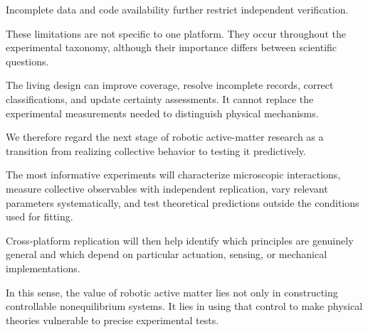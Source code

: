 Incomplete data
and code availability
further restrict
independent verification.

These limitations
are not specific
to one platform.
They occur
throughout the
experimental
taxonomy,
although their
importance differs
between scientific
questions.

The living design
can improve
coverage,
resolve incomplete
records,
correct classifications,
and update
certainty assessments.
It cannot
replace the
experimental
measurements
needed to
distinguish
physical mechanisms.

We therefore
regard the
next stage
of robotic
active-matter
research as
a transition
from realizing
collective
behavior to
testing it
predictively.

The most
informative
experiments
will characterize
microscopic
interactions,
measure collective
observables
with independent
replication,
vary relevant
parameters
systematically,
and test
theoretical
predictions
outside the
conditions used
for fitting.

Cross-platform
replication
will then
help identify
which principles
are genuinely
general and
which depend
on particular
actuation,
sensing,
or mechanical
implementations.

In this
sense,
the value
of robotic
active matter
lies not
only in
constructing
controllable
nonequilibrium
systems.
It lies
in using
that control
to make
physical theories
vulnerable
to precise
experimental
tests.

